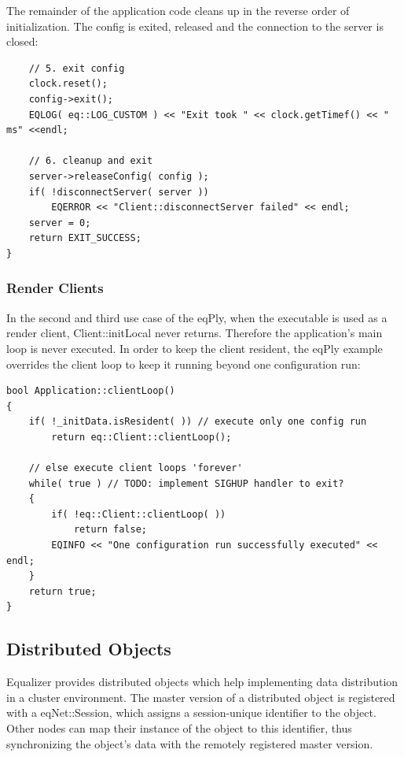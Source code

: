 \documentclass[10pt,a4]{scrartcl}
\begin{document}
The remainder of the application code cleans up in the reverse order of
initialization. The config is exited, released and the connection to
the server is closed:

{\footnotesize\begin{lstlisting}
    // 5. exit config
    clock.reset();
    config->exit();
    EQLOG( eq::LOG_CUSTOM ) << "Exit took " << clock.getTimef() << " ms" <<endl;

    // 6. cleanup and exit
    server->releaseConfig( config );
    if( !disconnectServer( server ))
        EQERROR << "Client::disconnectServer failed" << endl;
    server = 0;
    return EXIT_SUCCESS;
}
\end{lstlisting}}%

\subsubsection{Render Clients}

In the second and third use case of the \textsf{eqPly}, when the
executable is used as a render client, \textsf{Client::initLocal} never
returns. Therefore the application's main loop is never executed. In
order to keep the client resident, the \textsf{eqPly} example overrides
the client loop to keep it running beyond one configuration run:

{\footnotesize\begin{lstlisting}
bool Application::clientLoop()
{
    if( !_initData.isResident( )) // execute only one config run
        return eq::Client::clientLoop();

    // else execute client loops 'forever'
    while( true ) // TODO: implement SIGHUP handler to exit?
    {
        if( !eq::Client::clientLoop( ))
            return false;
        EQINFO << "One configuration run successfully executed" << endl;
    }
    return true;
}
\end{lstlisting}}%


\subsection{Distributed Objects}

Equalizer provides distributed objects which help implementing data
distribution in a cluster environment. The master version of a distributed
object is registered with a \textsf{eqNet::Session}, which assigns a
session-unique identifier to the object. Other nodes can map their
instance of the object to this identifier, thus synchronizing the
object's data with the remotely registered master version.
\end{document}
